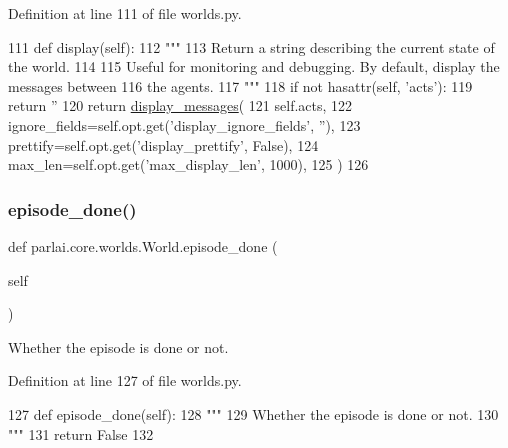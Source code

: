 Definition at line 111 of file worlds.\+py.


\begin{DoxyCode}
111     \textcolor{keyword}{def }display(self):
112         \textcolor{stringliteral}{"""}
113 \textcolor{stringliteral}{        Return a string describing the current state of the world.}
114 \textcolor{stringliteral}{}
115 \textcolor{stringliteral}{        Useful for monitoring and debugging. By default, display the messages between}
116 \textcolor{stringliteral}{        the agents.}
117 \textcolor{stringliteral}{        """}
118         \textcolor{keywordflow}{if} \textcolor{keywordflow}{not} hasattr(self, \textcolor{stringliteral}{'acts'}):
119             \textcolor{keywordflow}{return} \textcolor{stringliteral}{''}
120         \textcolor{keywordflow}{return} \hyperlink{namespaceparlai_1_1utils_1_1misc_a146f303a4c4b34993458968c74b55d2f}{display\_messages}(
121             self.acts,
122             ignore\_fields=self.opt.get(\textcolor{stringliteral}{'display\_ignore\_fields'}, \textcolor{stringliteral}{''}),
123             prettify=self.opt.get(\textcolor{stringliteral}{'display\_prettify'}, \textcolor{keyword}{False}),
124             max\_len=self.opt.get(\textcolor{stringliteral}{'max\_display\_len'}, 1000),
125         )
126 
\end{DoxyCode}
\mbox{\label{classparlai_1_1core_1_1worlds_1_1World_aaaef76f5bae4cdbe8f78241f8cd7c3a3}} 
\subsubsection{\texorpdfstring{episode\+\_\+done()}{episode\_done()}}
{\footnotesize\ttfamily def parlai.\+core.\+worlds.\+World.\+episode\+\_\+done (\begin{DoxyParamCaption}\item[{}]{self }\end{DoxyParamCaption})}

\begin{DoxyVerb}Whether the episode is done or not.
\end{DoxyVerb}
 

Definition at line 127 of file worlds.\+py.


\begin{DoxyCode}
127     \textcolor{keyword}{def }episode\_done(self):
128         \textcolor{stringliteral}{"""}
129 \textcolor{stringliteral}{        Whether the episode is done or not.}
130 \textcolor{stringliteral}{        """}
131         \textcolor{keywordflow}{return} \textcolor{keyword}{False}
132 
\end{DoxyCode}
\mbox{\label{classparlai_1_1core_1_1worlds_1_1World_aa8a3ab5345bbfa1d485dec974ed28b53}} 
